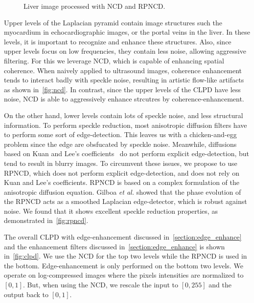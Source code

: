\begin{figure}[H]
{  }
  \caption{Liver image processed with NCD and RPNCD.}\label{fig:ncd_liver}
  \vspace{-0.15in}
\end{figure}
%

Upper levels of the Laplacian pyramid contain image structures such the myocardium in echocardiographic images, or the portal veins in the liver.
In these levels, it is important to recognize and enhance these structures.
Also, since upper levels focus on low frequencies, they contain less noise, allowing aggressive filtering.
For this we leverage NCD, which is capable of enhancing spatial coherence.
When naively applied to ultrasound images, coherence enhancement tends to interact badly with speckle noise, resulting in artistic flow-like artifacts as shown in~\cref{fig:ncd}.
In contrast, since the upper levels of the CLPD have less noise, NCD is able to aggressively enhance strcutres by coherence-enhancement.

On the other hand, lower levels contain lots of speckle noise, and less structural information.
To perform speckle reduction, most anisotropic diffusion filters have to perform some sort of edge-detection.
This leaves us with a chicken-and-egg problem since the edge are obsfucated by speckle noise.
Meanwhile, diffusions based on Kuan and Lee's coefficients~\cite{yongjianyu_speckle_2002, aja-fernandez_estimation_2006, krissian_oriented_2007} do not perform explicit edge-detection, but tend to result in blurry images.
To circumvent these issues, we propose to use RPNCD, which does not perform explicit edge-detection, and does not rely on Kuan and Lee's coefficients.
RPNCD is based on a complex formulation of the anisotropic diffusion equation.
Gilboa \textit{et al.} showed that the phase evolution of the RPNCD acts as a smoothed Laplacian edge-detector, which is robust against noise.
We found that it shows excellent speckle reduction properties, as demonstrated in~\cref{fig:rpncd}.

The overall CLPD with edge-enhancement discussed in~\cref{section:edge_enhance} and the enhancement filters discussed in~\cref{section:edge_enhance} is shown in~\cref{fig:clpd}.
We use the NCD for the top two levels while the RPNCD is used in the bottom.
Edge-enhancement is only performed on the bottom two levels.
We operate on log-compressed images where the pixels intensities are normalized to \([0, 1]\).
But, when using the NCD, we rescale the input to \([0, 255]\) and the output back to \([0, 1]\).

